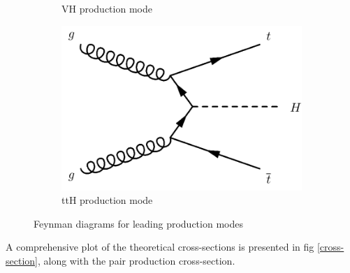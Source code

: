 \begin{figure}[h]
\begin{subfigure}{0.55\textwidth}
    \caption{VH production mode}
    \label{vh_feynman}
    \end{subfigure}\hfill
    \begin{subfigure}{0.3\textwidth}
    \includegraphics[width=\textwidth]{images/tth.png}
    \caption{ttH production mode}
    \label{tth_feynman}
    \end{subfigure}

    \caption{Feynman diagrams for leading production modes}
    \label{prod_feynman}
\end{figure}
A comprehensive plot of the theoretical cross-sections is presented in fig \ref{cross-section}, along with the pair production cross-section.


